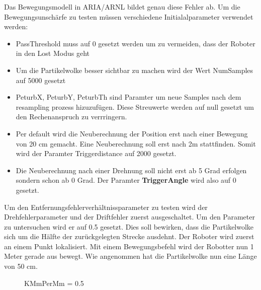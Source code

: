 \documentclass{article}
\begin{document}
Das Bewegungsmodell in ARIA/ARNL bildet genau diese Fehler ab.
Um die Bewegungsunsch\"arfe zu testen m\"ussen verschiedene Initialalparameter verwendet werden:
\begin{itemize}
\item PassThreshold muss auf 0 gesetzt werden um zu vermeiden, dass der Roboter in den Lost Modus geht
\item Um die Partikelwolke besser sichtbar zu machen wird der Wert NumSamples auf 5000 gesetzt
\item PeturbX, PeturbY, PeturbTh sind Paramter um neue Samples nach dem resampling prozess hizuzuf\"ugen. Diese Streuwerte werden auf null gesetzt um den Rechenanspruch zu verrringern.
\item Per default wird die Neuberechnung der Position erst nach einer Bewegung von 20 cm gemacht. Eine Neuberechnung soll erst nach 2m stattfinden. Somit wird der Paramter Triggerdistance auf 2000 gesetzt. 
\item Die Neuberechnung nach einer Drehnung soll nicht erst ab 5 Grad erfolgen sondern schon ab 0 Grad. Der Paramter \textbf{TriggerAngle} wird also auf 0 gesetzt.
\end{itemize}

Um den Entfernungsfehlerverh\"altnissparameter zu testen wird der Drehfehlerparameter und der Driftfehler zuerst ausgeschaltet. Um den Parameter zu untersuchen wird er auf 0.5 gesetzt. Dies soll bewirken, dass die Partikelwolke sich um die H\"alfte der zur\"uckgelegten Strecke ausdehnt. Der Roboter wird zuerst an einem Punkt lokalisiert. Mit einem Bewegungsbefehl wird der Robotter nun 1 Meter gerade aus bewegt. Wie angenommen hat die Partikelwolke nun eine L\"ange von 50 cm. 

\begin{figure}
  \centering
  \caption{KMmPerMm = 0.5}
  \label{KMmPerMmTest}
\end{figure}
\end{document}
